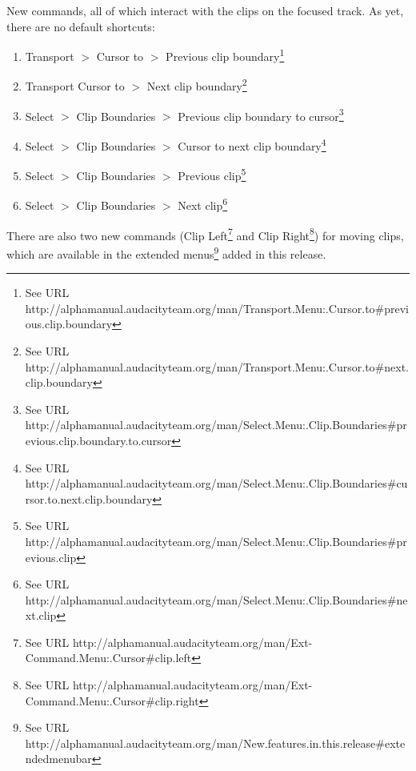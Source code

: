 New commands, all of which interact with the clips on the focused track. As yet, there are no default shortcuts:
\begin{enumerate}
\item 
Transport \mbox{$>$} Cursor to \mbox{$>$} Previous clip boundary\footnote{See URL http://alphamanual.audacityteam.org/man/Transport.Menu:.Cursor.to\#previous.clip.boundary}

\item 
Transport Cursor to \mbox{$>$} Next clip boundary\footnote{See URL http://alphamanual.audacityteam.org/man/Transport.Menu:.Cursor.to\#next.clip.boundary}

\item 
Select \mbox{$>$} Clip Boundaries \mbox{$>$} Previous clip boundary to cursor\footnote{See URL http://alphamanual.audacityteam.org/man/Select.Menu:.Clip.Boundaries\#previous.clip.boundary.to.cursor} 

\item 
Select \mbox{$>$} Clip Boundaries \mbox{$>$} Cursor to next clip boundary\footnote{See URL http://alphamanual.audacityteam.org/man/Select.Menu:.Clip.Boundaries\#cursor.to.next.clip.boundary} 

\item 
Select \mbox{$>$} Clip Boundaries \mbox{$>$} Previous clip\footnote{See URL http://alphamanual.audacityteam.org/man/Select.Menu:.Clip.Boundaries\#previous.clip} 

\item 
Select \mbox{$>$} Clip Boundaries \mbox{$>$} Next clip\footnote{See URL http://alphamanual.audacityteam.org/man/Select.Menu:.Clip.Boundaries\#next.clip} 

\end{enumerate}

There are also two new commands (Clip Left\footnote{See URL http://alphamanual.audacityteam.org/man/Ext-Command.Menu:.Cursor\#clip.left} and Clip Right\footnote{See URL http://alphamanual.audacityteam.org/man/Ext-Command.Menu:.Cursor\#clip.right}) for moving clips, which are available in the extended menus\footnote{See URL http://alphamanual.audacityteam.org/man/New.features.in.this.release\#extendedmenubar} added in this release.

